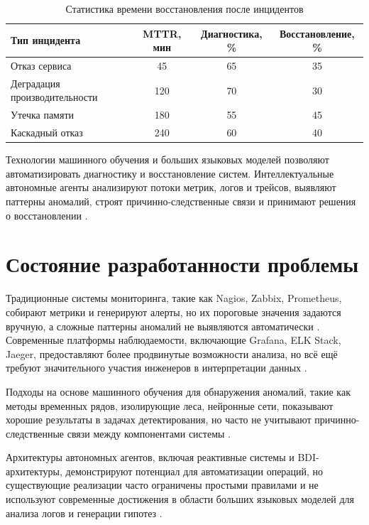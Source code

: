 \begin{table}[H]
\centering
\caption{Статистика времени восстановления после инцидентов}
\label{tab:recovery_time_stats}
\begin{tabular}{|p{5cm}|c|c|c|}
\hline
\textbf{Тип инцидента} & \textbf{MTTR, мин} & \textbf{Диагностика, \%} & \textbf{Восстановление, \%} \\
\hline
Отказ сервиса & 45 & 65 & 35 \\
\hline
Деградация производительности & 120 & 70 & 30 \\
\hline
Утечка памяти & 180 & 55 & 45 \\
\hline
Каскадный отказ & 240 & 60 & 40 \\
\hline
\end{tabular}
\end{table}

Технологии машинного обучения и больших языковых моделей позволяют автоматизировать диагностику и восстановление систем. Интеллектуальные автономные агенты анализируют потоки метрик, логов и трейсов, выявляют паттерны аномалий, строят причинно-следственные связи и принимают решения о восстановлении \cite{aiops_survey}.

\section*{Состояние разработанности проблемы}

Традиционные системы мониторинга, такие как Nagios, Zabbix, Prometheus, собирают метрики и генерируют алерты, но их пороговые значения задаются вручную, а сложные паттерны аномалий не выявляются автоматически \cite{prometheus_docs}. Современные платформы наблюдаемости, включающие Grafana, ELK Stack, Jaeger, предоставляют более продвинутые возможности анализа, но всё ещё требуют значительного участия инженеров в интерпретации данных \cite{grafana_docs,charity_majors_observability}.

Подходы на основе машинного обучения для обнаружения аномалий, такие как методы временных рядов, изолирующие леса, нейронные сети, показывают хорошие результаты в задачах детектирования, но часто не учитывают причинно-следственные связи между компонентами системы \cite{hastie_elements,bishop_pattern_recognition}.

Архитектуры автономных агентов, включая реактивные системы и BDI-архитектуры, демонстрируют потенциал для автоматизации операций, но существующие реализации часто ограничены простыми правилами и не используют современные достижения в области больших языковых моделей для анализа логов и генерации гипотез \cite{aiops_survey}.


